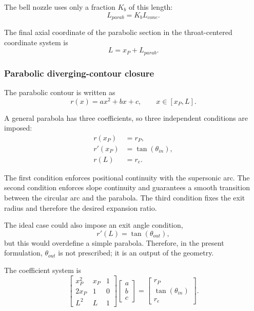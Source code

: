 \documentclass[11pt,a4paper]{article}
\begin{document}
The bell nozzle uses only a fraction $K_b$ of this length:
\begin{equation}
L_{parab}=K_b L_{cone}.
\label{eq:Lparab}
\end{equation}

The final axial coordinate of the parabolic section in the throat-centered coordinate system is
\begin{equation}
L=x_P+L_{parab}.
\label{eq:Lfinal}
\end{equation}

\subsubsection{Parabolic diverging-contour closure}

The parabolic contour is written as
\begin{equation}
r(x)=ax^2+bx+c,\qquad x\in[x_P,L].
\label{eq:parabola}
\end{equation}

A general parabola has three coefficients, so three independent conditions are imposed:
\begin{align}
r(x_P)&=r_P,
\label{eq:par_cond1}\\
r'(x_P)&=\tan(\theta_{in}),
\label{eq:par_cond2}\\
r(L)&=r_e.
\label{eq:par_cond3}
\end{align}

The first condition enforces positional continuity with the supersonic arc. The second condition enforces slope continuity and guarantees a smooth transition between the circular arc and the parabola. The third condition fixes the exit radius and therefore the desired expansion ratio.

The ideal case could also impose an exit angle condition,
\begin{equation}
r'(L)=\tan(\theta_{out}),
\end{equation}
but this would overdefine a simple parabola. Therefore, in the present formulation, $\theta_{out}$ is not prescribed; it is an output of the geometry.

The coefficient system is
\begin{equation}
\begin{bmatrix}
x_P^2 & x_P & 1\\
2x_P & 1 & 0\\
L^2 & L & 1
\end{bmatrix}
\begin{bmatrix}
a\\b\\c
\end{bmatrix}
=
\begin{bmatrix}
r_P\\ \tan(\theta_{in})\\ r_e
\end{bmatrix}.
\label{eq:parabola_matrix}
\end{equation}
\end{document}
